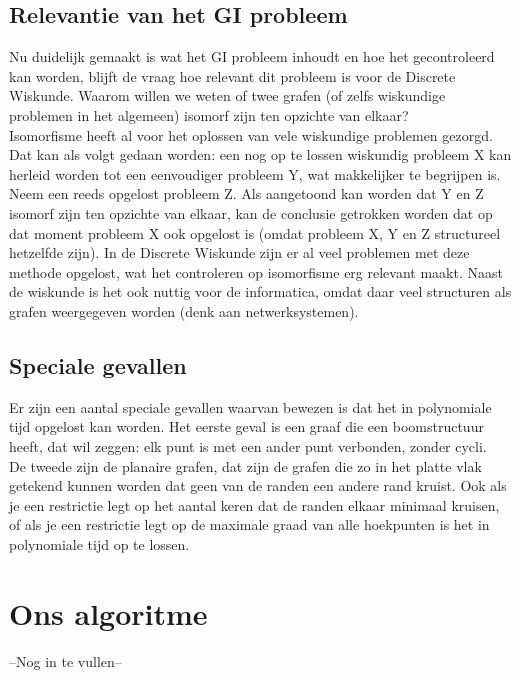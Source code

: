 \documentclass{article}
\begin{document}
\subsection{Relevantie van het GI probleem}
Nu duidelijk gemaakt is wat het GI probleem inhoudt en hoe het gecontroleerd kan worden, blijft de vraag hoe relevant dit probleem is voor de Discrete Wiskunde. Waarom willen we weten of twee grafen (of zelfs wiskundige problemen in het algemeen) isomorf zijn ten opzichte van elkaar?\\

Isomorfisme heeft al voor het oplossen van vele wiskundige problemen gezorgd. Dat kan als volgt gedaan worden: een nog op te lossen wiskundig probleem X kan herleid worden tot een eenvoudiger probleem Y, wat makkelijker te begrijpen is. Neem een reeds opgelost probleem Z. Als aangetoond kan worden dat Y en Z isomorf zijn ten opzichte van elkaar, kan de conclusie getrokken worden dat op dat moment probleem X ook opgelost is (omdat probleem X, Y en Z structureel hetzelfde zijn). In de Discrete Wiskunde zijn er al veel problemen met deze methode opgelost, wat het controleren op isomorfisme erg relevant maakt.
Naast de wiskunde is het ook nuttig voor de informatica, omdat daar veel structuren als grafen weergegeven worden (denk aan netwerksystemen).

\subsection{Speciale gevallen}
Er zijn een aantal speciale gevallen waarvan bewezen is dat het in polynomiale tijd opgelost kan worden. Het eerste geval is een graaf die een boomstructuur heeft, dat wil zeggen: elk punt is met een ander punt verbonden, zonder cycli.\\
De tweede zijn de planaire grafen, dat zijn de grafen die zo in het platte vlak getekend kunnen worden dat geen van de randen een andere rand kruist. Ook als je een restrictie legt op het aantal keren dat de randen elkaar minimaal kruisen, of als je een restrictie legt op de maximale graad van alle hoekpunten is het in polynomiale tijd op te lossen.
\pagebreak


\section{Ons algoritme}
--Nog in te vullen--
\pagebreak
\end{document}
